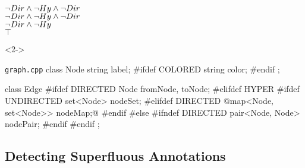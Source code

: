 \begin{frame}[fragile]{\myframetitle}
\begin{mycolumns}[t,columns=3,widths={40,23,37},animation=none]
{{\begin{flushright}
				{\color{gray}$\neg Dir \wedge \neg Hy \wedge \neg Dir$}\\
				{\color{gray}$\neg Dir \wedge \neg Hy \wedge \neg Dir$}\\
				{\color{gray}$\neg Dir \wedge \neg Hy$}\\
				{\color{gray}$\top$}
			\end{flushright}
		}}
	\mynextcolumn
		\begin{uncoverenv}<2->
			\begin{cpptight}[basicstyle=\small]{\texttt{graph.cpp}}
class Node {
	string label;
#ifdef COLORED
	string color;
#endif
};

class Edge {
#ifdef DIRECTED
	Node fromNode, toNode;
#elifdef HYPER
#ifdef UNDIRECTED
	set<Node> nodeSet;
#elifdef DIRECTED
	@map<Node, set<Node>> nodeMap;@
#endif
#else
#ifndef DIRECTED
	pair<Node, Node> nodePair;
#endif
#endif
};
			\end{cpptight}
		\end{uncoverenv}
	\end{mycolumns}
\end{frame}

\subsection{Detecting Superfluous Annotations}

